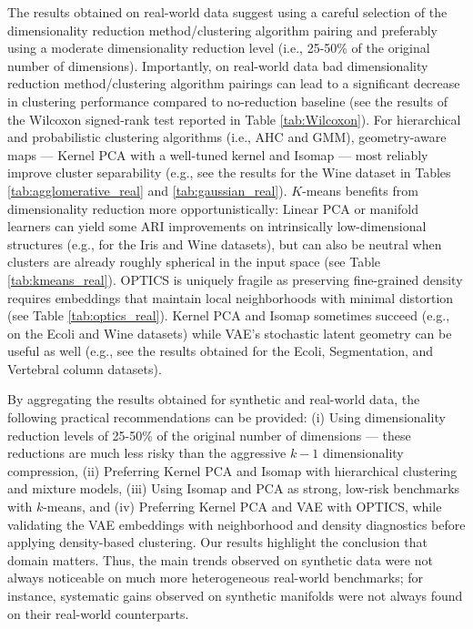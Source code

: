 \documentclass[preprint,12pt]{elsarticle}
\begin{document}
The results obtained on real-world data suggest using a careful selection of the dimensionality reduction method/clustering algorithm pairing and preferably using a moderate dimensionality reduction level (i.e., 25-50\% of the original number of dimensions). Importantly, on real-world data bad dimensionality reduction method/clustering
algorithm pairings can lead to a significant decrease in clustering performance compared to no-reduction baseline (see the results of the Wilcoxon signed-rank test reported in Table \ref{tab:Wilcoxon}). For hierarchical and probabilistic clustering algorithms (i.e., AHC and GMM), geometry-aware maps — Kernel PCA with a well-tuned kernel and Isomap — most reliably improve cluster separability (e.g., see the results for the Wine dataset in Tables \ref{tab:agglomerative_real} and \ref{tab:gaussian_real}). $K$-means benefits from dimensionality reduction more opportunistically: Linear PCA or manifold learners can yield some ARI improvements on intrinsically low-dimensional structures (e.g., for the Iris and Wine datasets), but can also be neutral when clusters are already roughly spherical in the input space (see Table \ref{tab:kmeans_real}). OPTICS is uniquely fragile as preserving fine-grained density requires embeddings that maintain local neighborhoods with minimal distortion (see Table \ref{tab:optics_real}). Kernel PCA and Isomap sometimes succeed (e.g., on the Ecoli and Wine datasets) while VAE’s stochastic latent geometry can be useful as well (e.g., see the results obtained for the Ecoli, Segmentation, and Vertebral column datasets). 

By aggregating the results obtained for synthetic and real-world data, the following practical recommendations can be provided: (i) Using dimensionality reduction levels of 25-50\% of the original number of dimensions — these reductions are much less risky than the aggressive $k-1$ dimensionality compression, (ii) Preferring Kernel PCA and Isomap with hierarchical clustering and mixture models, (iii) Using Isomap and PCA as strong, low-risk benchmarks with $k$-means, and (iv) Preferring Kernel PCA and VAE with OPTICS, while validating the VAE embeddings with neighborhood and density diagnostics before applying density-based clustering.
Our results highlight the conclusion that domain matters. Thus, the main trends observed on synthetic data were not always noticeable on much more heterogeneous real-world benchmarks; for instance, systematic gains observed on synthetic manifolds were not always found on their real-world counterparts.
\end{document}
